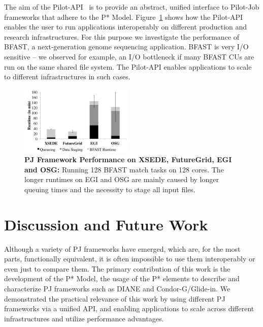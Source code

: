 \documentclass{sig-alternate}
\begin{document}
The aim of the Pilot-API~\cite{pilot_api} is to provide an abstract,
unified interface to Pilot-Job frameworks that adhere to the P* Model.
Figure~\ref{fig:perf_perf-bfast-bj} shows how the Pilot-API enables
the user to run applications interoperably on different production and
research infrastructures. For this purpose we investigate the
performance of BFAST, a next-generation genome sequencing
application. BFAST is very I/O sensitive -- we observed for example,
an I/O bottleneck if many BFAST CUs are run on the same shared file
system. The Pilot-API enables applications to scale to different
infrastructures in such cases.

 
\begin{figure}[t]
	\upp
\centering
\includegraphics[width=0.48\textwidth]{perf/interop/128-bfast-egi-fg-xsede-osg.pdf}
\caption{\textbf{PJ Framework Performance on XSEDE, FutureGrid, EGI and 
  OSG:} Running 128 BFAST match tasks on 128 cores. The longer runtimes on EGI 
  and OSG are mainly caused by  longer queuing times and the necessity to   stage all input files. }\upp\upp\upp
  \label{fig:perf_perf-bfast-bj}
\end{figure}


\section{Discussion and Future Work} 
\label{sec:discussion-future-work}

Although a variety of PJ frameworks have emerged, which are, for the
most parts, functionally equivalent, it is often impossible to use
them interoperably or even just to compare them. The primary
contribution of this work is the development of the P* Model, the
usage of the P* elements to describe and characterize PJ frameworks
such as DIANE and Condor-G/Glide-in.  We demonstrated the practical
relevance of this work by using different PJ frameworks via a unified
API, and enabling applications to scale across different
infrastructures and utilize performance advantages.
\end{document}
